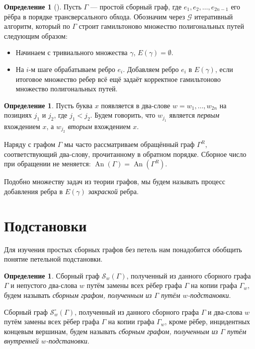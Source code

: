 \documentclass{article}
\theoremstyle{definition}
\newtheorem{definition}[theorem]{Определение}
\newcommand{\An}{\operatorname{An}}
\newcommand{\G}{\mathcal{G}}
\begin{document}
\begin{definition}[\cite{MaksaevPreprint}]
    Пусть $\Gamma$ --- простой сборный граф, где $e_1,e_2,\ldots,e_{2n - 1}$ его рёбра в порядке трансверсального обхода. Обозначим через $\G$ итеративный алгоритм, который по $\Gamma$ строит гамильтоново множество полигональных путей следующим образом:
   
    \begin{itemize}
        \item Начинаем с тривиального множества $\gamma$, $E(\gamma) = \emptyset$.
        \item На $i$-м шаге обрабатываем ребро $e_i$. Добавляем ребро $e_i$ в $E(\gamma)$, если итоговое множество ребер всё ещё задаёт корректное гамильтоново множество полигональных путей. 
    \end{itemize}
\end{definition}

\begin{definition}
    Пусть буква $x$ появляется в два-слове $w = w_1,\ldots,w_{2n}$ на позициях $j_1$ и $j_2$, где $j_1 < j_2$. Будем говорить, что $w_{j_1}$ является \emph{первым} вхождением $x$, а $w_{j_2}$ \emph{вторым} вхождением $x$. 
\end{definition}

Наряду с графом $\Gamma$ мы часто рассматриваем обращённый граф $\Gamma^R$, соответствующий два-слову, прочитанному в обратном порядке. Сборное число при обращении не меняется: $\An(\Gamma)=\An(\Gamma^R)$.

Подобно множеству задач из теории графов, мы будем называть процесс добавления ребра в $E(\gamma)$ \emph{закраской} ребра. 

\section{Подстановки}\label{sec:saturations}

Для изучения простых сборных графов без петель нам понадобится обобщить понятие петельной подстановки.

\begin{definition}
     Сборный граф $\mathcal{S}_w(\Gamma)$, полученный из данного сборного графа $\Gamma$ и непустого два-слова $w$ путём замены всех рёбер графа $\Gamma$ на копии графа $\Gamma_{w}$, будем называть \textit{сборным графом, полученным из $\Gamma$ путём $w$-подстановки}.

     Сборный граф $\mathcal{S}^{\circ}_w(\Gamma)$, полученный из данного сборного графа $\Gamma$ и два-слова $w$ путём замены всех рёбер графа $\Gamma$ на копии графа $\Gamma_{w}$, кроме рёбер, инцидентных концевым вершинам, будем называть \textit{сборным графом, полученным из $\Gamma$ путём внутренней $w$-подстановки}.
\end{definition}
\end{document}
